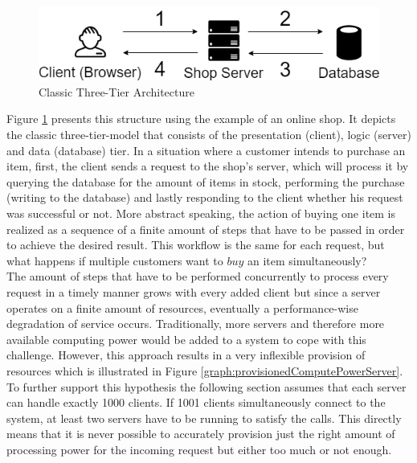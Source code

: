 \begin{figure}[ht]
    \includegraphics[width=0.9\linewidth]{images/drawio/3tier-oneclient.png}\centering
    \caption {Classic Three-Tier Architecture}
    \label{fig:3tier1client}
\end{figure}

Figure \ref{fig:3tier1client} presents this structure using the example of an online shop. It depicts the classic three-tier-model that consists of the presentation (client), logic (server) and data (database) tier.\autocite{Ramirez2000Three-TierArchitecture} In a situation where a customer intends to purchase an item, first, the client sends a request to the shop's server, which will process it by querying the database for the amount of items in stock, performing the purchase (writing to the database) and lastly responding to the client whether his request was successful or not. More abstract speaking, the action of buying one item is realized as a sequence of a finite amount of steps that have to be passed in order to achieve the desired result. This workflow is the same for each request, but what happens if multiple customers want to $buy$ an item simultaneously? \\
The amount of steps that have to be performed concurrently to process every request in a timely manner grows with every added client but since a server operates on a finite amount of resources, eventually a performance-wise degradation of service occurs. Traditionally, more servers and therefore more available computing power would be added to a system to cope with this challenge. However, this approach results in a very inflexible provision of resources which is illustrated in Figure \ref{graph:provisionedComputePowerServer}. To further support this hypothesis the following section assumes that each server can handle exactly 1000 clients. If 1001 clients simultaneously connect to the system, at least two servers have to be running to satisfy the calls. This directly means that it is never possible to accurately provision just the right amount of processing power for the incoming request but either too much or not enough. 

